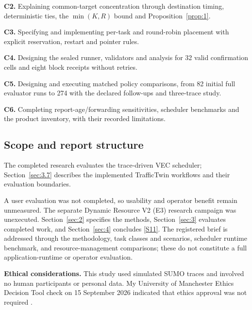 \documentclass[12pt,a4paper]{article}
\begin{document}
\textbf{C2.} Explaining common-target concentration through destination timing, deterministic ties, the $\min(K,R)$ bound and Proposition~\ref{prop:1}.

\textbf{C3.} Specifying and implementing per-task and round-robin placement with explicit reservation, restart and pointer rules.

\textbf{C4.} Designing the sealed runner, validators and analysis for 32 valid confirmation cells and eight block receipts without retries.

\textbf{C5.} Designing and executing matched policy comparisons, from 82 initial full evaluator runs to 274 with the declared follow-ups and three-trace study.

\textbf{C6.} Completing report-age/forwarding sensitivities, scheduler benchmarks and the product inventory, with their recorded limitations.

\FloatBarrier
\subsection{Scope and report structure}\label{sec:1.4}

The completed research evaluates the trace-driven VEC scheduler; Section~\ref{sec:3.7} describes the implemented TrafficTwin workflows and their evaluation boundaries.

A user evaluation was not completed, so usability and operator benefit remain unmeasured. The separate Dynamic Resource V2 (E3) research campaign was unexecuted. Section~\ref{sec:2} specifies the methods, Section~\ref{sec:3} evaluates completed work, and Section~\ref{sec:4} concludes \hyperref[source-s11]{[S11]}. The registered brief \cite{ref48} is addressed through the methodology, task classes and scenarios, scheduler runtime benchmark, and resource-management comparisons; these do not constitute a full application-runtime or operator evaluation.



\textbf{Ethical considerations.} This study used simulated SUMO traces and involved no human participants or personal data. My University of Manchester Ethics Decision Tool check on 15 September 2026 indicated that ethics approval was not required \cite{ref44}.
\end{document}
